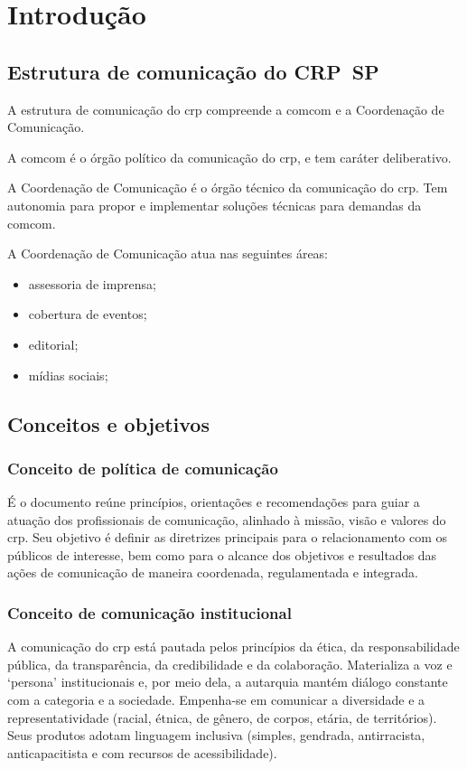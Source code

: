 \chapter{Introdução}

\section{Estrutura de comunicação do CRP~SP}

A estrutura de comunicação do \ac{crp} compreende a \ac{comcom} e a Coordenação de Comunicação.

A \ac{comcom} é o órgão político da comunicação do \ac{crp}, e tem caráter deliberativo.

A Coordenação de Comunicação é o órgão técnico da comunicação do \ac{crp}. Tem autonomia para propor e implementar soluções técnicas para demandas da \ac{comcom}.

A Coordenação de Comunicação atua nas seguintes áreas:

\begin{itemize}
	\item assessoria de imprensa;
	\item cobertura de eventos;
	\item editorial;
	\item mídias sociais;
\end{itemize}

\section{Conceitos e objetivos}

\subsection{Conceito de política de comunicação}

É o documento reúne princípios, orientações e recomendações para guiar a atuação dos profissionais de comunicação, alinhado à missão, visão e valores do \ac{crp}. Seu objetivo é definir as diretrizes principais para o relacionamento com os públicos de interesse, bem como para o alcance dos objetivos e resultados das ações de comunicação de maneira coordenada, regulamentada e integrada.

\subsection{Conceito de comunicação institucional}
A comunicação do \ac{crp} está pautada pelos princípios da ética, da responsabilidade pública, da transparência, da credibilidade e da colaboração. Materializa a voz e `persona' institucionais e, por meio dela, a autarquia mantém diálogo constante com a categoria e a sociedade. Empenha-se em comunicar a diversidade e a representatividade (racial, étnica, de gênero, de corpos, etária, de territórios). Seus produtos adotam linguagem inclusiva (simples, gendrada, antirracista, anticapacitista e com recursos de acessibilidade).

